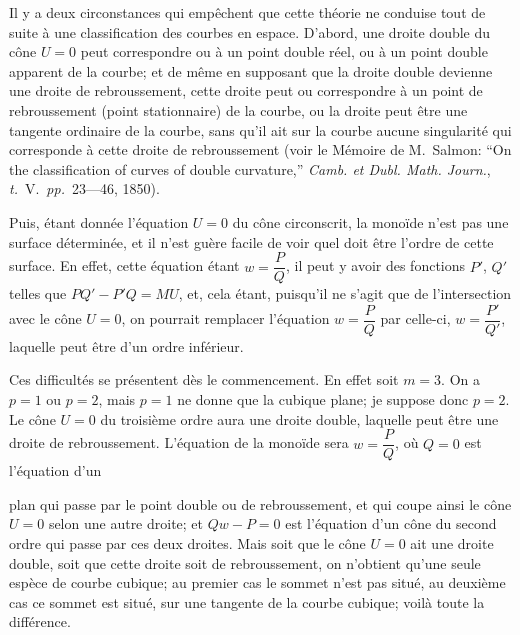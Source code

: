 \documentclass[11pt,a4paper]{article}
\newcommand{\tome}{\textit{t.}}
\newcommand{\pages}{\textit{pp.}}
\begin{document}
Il y a deux circonstances qui emp\^{e}chent que cette th\'{e}orie ne conduise tout de suite \`{a} une classification des courbes en espace. D'abord, une droite double du c\^{o}ne $U = 0$ peut correspondre ou \`{a} un point double r\'{e}el, ou \`{a} un point double apparent de la courbe; et de m\^{e}me en supposant que la droite double devienne une droite de rebroussement, cette droite peut ou correspondre \`{a} un point de rebroussement (point stationnaire) de la courbe, ou la droite peut \^{e}tre une tangente ordinaire de la courbe, sans qu'il ait sur la courbe aucune singularit\'{e} qui corresponde \`{a} cette droite de rebroussement (voir le M\'{e}moire de M.~Salmon: ``On the classification of curves of double curvature,'' \textit{Camb. et Dubl. Math. Journ.}, \tome~V.\ \pages~23---46, 1850).

Puis, \'{e}tant donn\'{e}e l'\'{e}quation $U = 0$ du c\^{o}ne circonscrit, la mono\"{i}de n'est pas une surface d\'{e}termin\'{e}e, et il n'est gu\`{e}re facile de voir quel doit \^{e}tre l'ordre de cette surface. En effet, cette \'{e}quation \'{e}tant $w = \dfrac{P}{Q}$, il peut y avoir des fonctions $P'$, $Q'$ telles que $PQ' - P'Q = MU$, et, cela \'{e}tant, puisqu'il ne s'agit que de l'intersection avec le c\^{o}ne $U = 0$, on pourrait remplacer l'\'{e}quation $w = \dfrac{P}{Q}$ par celle-ci, $w = \dfrac{P'}{Q'}$, laquelle peut \^{e}tre d'un ordre inf\'{e}rieur.

Ces difficult\'{e}s se pr\'{e}sentent d\`{e}s le commencement. En effet soit $m = 3$. On a $p = 1$ ou $p = 2$, mais $p = 1$ ne donne que la cubique plane; je suppose donc $p = 2$. Le c\^{o}ne $U = 0$ du troisi\`{e}me ordre aura une droite double, laquelle peut \^{e}tre une droite de rebroussement. L'\'{e}quation de la mono\"{i}de sera $w = \dfrac{P}{Q}$, o\`{u} $Q = 0$ est l'\'{e}quation d'un

\clearpage

plan qui passe par le point double ou de rebroussement, et qui coupe ainsi le c\^{o}ne $U = 0$ selon une autre droite; et $Qw - P = 0$ est l'\'{e}quation d'un c\^{o}ne du second ordre qui passe par ces deux droites. Mais soit que le c\^{o}ne $U = 0$ ait une droite double, soit que cette droite soit de rebroussement, on n'obtient qu'une seule esp\`{e}ce de courbe cubique; au premier cas le sommet n'est pas situ\'{e}, au deuxi\`{e}me cas ce sommet est situ\'{e}, sur une tangente de la courbe cubique; voil\`{a} toute la diff\'{e}rence.
\end{document}
